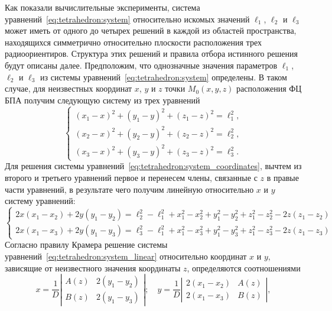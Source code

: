 \documentclass[../main.tex]{subfiles}
\begin{document}
Как показали вычислительные эксперименты, система уравнений~\eqref{eq:tetrahedron:system} относительно искомых значений $\ell_1$, $\ell_2$ и $\ell_3$ может иметь от одного до четырех решений в каждой из областей пространства, находящихся симметрично относительно плоскости расположения трех радиоориентиров. Структура этих решений и правила отбора истинного решения будут описаны далее. Предположим, что однозначные значения параметров $\ell_1$, $\ell_2$ и $\ell_3$ из системы уравнений~\eqref{eq:tetrahedron:system} определены. В таком случае, для неизвестных координат $x$, $y$ и $z$ точки $M_0\left(x, y, z\right)$ расположения ФЦ БПА получим следующую систему из трех уравнений
\begin{equation}\label{eq:tetrahedron:system_coordinates}
    \begin{cases}
        \left(x_1 - x\right)^2 + \left(y_1 - y\right)^2 + \left(z_1 - z\right)^2 = \ell_1^2, \\
        \left(x_2 - x\right)^2 + \left(y_2 - y\right)^2 + \left(z_2 - z\right)^2 = \ell_2^2, \\
        \left(x_3 - x\right)^2 + \left(y_3 - y\right)^2 + \left(z_3 - z\right)^2 = \ell_3^2.
    \end{cases}
\end{equation}
Для решения системы уравнений~\eqref{eq:tetrahedron:system_coordinates}, вычтем из второго и третьего уравнений первое и перенесем члены, связанные с $z$ в правые части уравнений, в результате чего получим линейную относительно $x$ и $y$ систему уравнений:
\begin{equation} \label{eq:tetrahedron:system_linear}
    \begin{cases}
        2x \left(x_1 - x_2\right) + 2 y \left(y_1 - y_2\right) =\ell_2^2 - \ell_1^2 + x_1^2 - x_2^2 + y_1^2 - y_2^2 + z_1^2 - z_2^2 - 2z\left(z_1 - z_2\right) \\
        2x \left(x_1 - x_3\right) + 2 y \left(y_1 - y_3\right) =\ell_3^2 - \ell_1^2 + x_1^2 - x_3^2 + y_1^2 - y_3^2 + z_1^2 - z_3^2 - 2z\left(z_1 - z_3\right)
    \end{cases}
\end{equation}
Согласно правилу Крамера решение системы уравнений~\eqref{eq:tetrahedron:system_linear} относительно координат $x$ и $y$, зависящие от неизвестного значения координаты $z$, определяются соотношениями
\begin{equation}\label{eq:tetrahedron:kramer}
  x = \frac{1}{D}\left| \begin{matrix}
    A\left(z\right) & 2 \left(y_1 - y_2\right) \\
    B\left(z\right) & 2 \left(y_1 - y_3\right)
  \end{matrix}\right|;\quad
  y = \frac{1}{D}\left| \begin{matrix}
    2\left(x_1 - x_2\right) & A\left(z\right) \\
    2\left(x_1 - x_3\right) & B\left(z\right)
  \end{matrix}\right|,
\end{equation}
\end{document}
